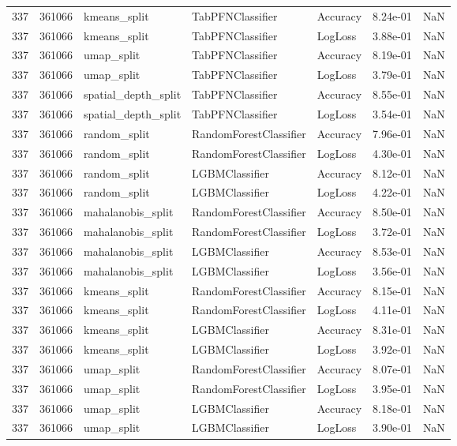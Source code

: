 \begin{tabular}{rrlllrr}
337 & 361066 & kmeans\_split & TabPFNClassifier & Accuracy & 8.24e-01 & NaN \\
337 & 361066 & kmeans\_split & TabPFNClassifier & LogLoss & 3.88e-01 & NaN \\
337 & 361066 & umap\_split & TabPFNClassifier & Accuracy & 8.19e-01 & NaN \\
337 & 361066 & umap\_split & TabPFNClassifier & LogLoss & 3.79e-01 & NaN \\
337 & 361066 & spatial\_depth\_split & TabPFNClassifier & Accuracy & 8.55e-01 & NaN \\
337 & 361066 & spatial\_depth\_split & TabPFNClassifier & LogLoss & 3.54e-01 & NaN \\
337 & 361066 & random\_split & RandomForestClassifier & Accuracy & 7.96e-01 & NaN \\
337 & 361066 & random\_split & RandomForestClassifier & LogLoss & 4.30e-01 & NaN \\
337 & 361066 & random\_split & LGBMClassifier & Accuracy & 8.12e-01 & NaN \\
337 & 361066 & random\_split & LGBMClassifier & LogLoss & 4.22e-01 & NaN \\
337 & 361066 & mahalanobis\_split & RandomForestClassifier & Accuracy & 8.50e-01 & NaN \\
337 & 361066 & mahalanobis\_split & RandomForestClassifier & LogLoss & 3.72e-01 & NaN \\
337 & 361066 & mahalanobis\_split & LGBMClassifier & Accuracy & 8.53e-01 & NaN \\
337 & 361066 & mahalanobis\_split & LGBMClassifier & LogLoss & 3.56e-01 & NaN \\
337 & 361066 & kmeans\_split & RandomForestClassifier & Accuracy & 8.15e-01 & NaN \\
337 & 361066 & kmeans\_split & RandomForestClassifier & LogLoss & 4.11e-01 & NaN \\
337 & 361066 & kmeans\_split & LGBMClassifier & Accuracy & 8.31e-01 & NaN \\
337 & 361066 & kmeans\_split & LGBMClassifier & LogLoss & 3.92e-01 & NaN \\
337 & 361066 & umap\_split & RandomForestClassifier & Accuracy & 8.07e-01 & NaN \\
337 & 361066 & umap\_split & RandomForestClassifier & LogLoss & 3.95e-01 & NaN \\
337 & 361066 & umap\_split & LGBMClassifier & Accuracy & 8.18e-01 & NaN \\
337 & 361066 & umap\_split & LGBMClassifier & LogLoss & 3.90e-01 & NaN \\

\end{tabular}
